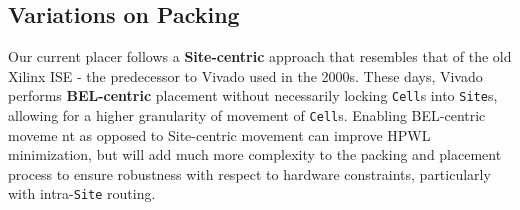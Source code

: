 % 
% 
% 
% 
% 
% 



\subsection{Variations on Packing}
Our current placer follows a \textbf{Site-centric} approach that resembles that of the old Xilinx ISE - the predecessor to Vivado used in the 2000s.
These days, Vivado performs \textbf{BEL-centric} placement without necessarily locking \texttt{Cell}s into \texttt{Site}s, allowing for a higher granularity of movement of \texttt{Cell}s. 
Enabling BEL-centric moveme
nt as opposed to Site-centric movement can improve HPWL minimization, but will add much more complexity to the packing and placement process to ensure robustness with respect to hardware constraints, particularly with intra-\texttt{Site} routing.

